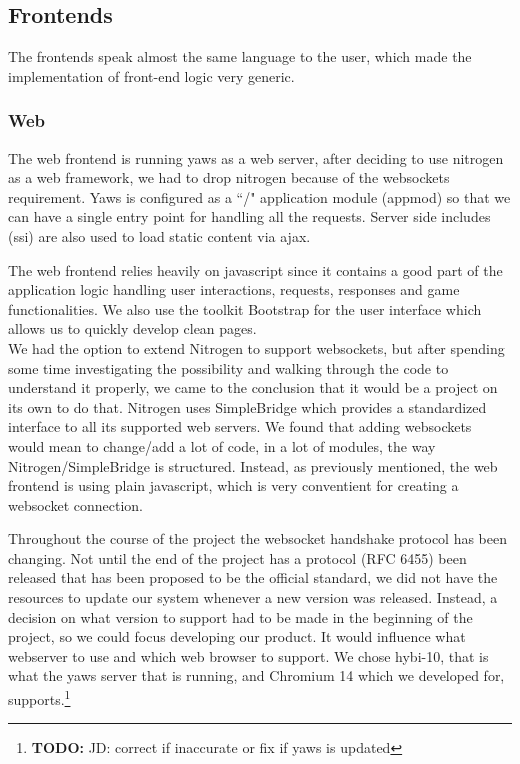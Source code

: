 \documentclass[11pt,a4paper]{report}
\newcommand{\todo}[1]{\footnote{{\color{red} {\bf TODO:} #1}}}
\begin{document}
\subsection{Frontends}
\label{sec:frontends}
The frontends speak almost the same language to the user, which made the
implementation of front-end logic very generic.

\subsubsection{Web}
The web frontend is running yaws as a web server, after deciding to use nitrogen
as a web framework, we had to drop nitrogen because of the websockets
requirement. Yaws is configured as a ``/" application module (appmod) so that we can have a single entry point for handling all the requests. Server side includes (ssi) are also used to load static content via ajax.

The web frontend relies heavily on javascript since it contains a good part of the application logic handling user interactions, requests, responses and game functionalities. We also use the toolkit Bootstrap\cite{bootstrap} for the user interface which allows us to quickly develop clean pages.\\

We had the option to extend Nitrogen to support websockets, but after spending
some time investigating the possibility and walking through the code to
understand it properly, we came to the conclusion that it would be a project on
its own to do that. Nitrogen uses SimpleBridge which provides a standardized
interface to all its supported web servers. We found that adding websockets
would mean to change/add a lot of code, in a lot of modules, the way
Nitrogen/SimpleBridge is structured. Instead, as previously mentioned, the web
frontend is using plain javascript, which is very conventient for creating a
websocket connection.

Throughout the course of the project the websocket handshake protocol has
been changing.
Not until the end of the project has a protocol (RFC 6455) been released that
has been proposed to be the official standard, we did not have the resources
to update our system whenever a new version was released. Instead, a decision
on what version to support had to be made in the beginning of the project, so we
could focus developing our product.
It would influence what webserver to use and which web browser to support. We
chose hybi-10, that is what the yaws server that is running, and Chromium 14
which we developed for, supports.\todo{JD: correct if inaccurate or fix if yaws is updated}
\end{document}
